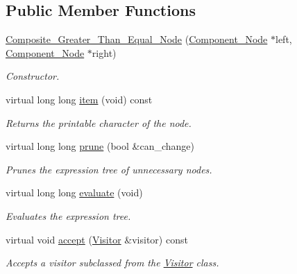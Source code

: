 \subsection*{Public Member Functions}
\begin{DoxyCompactItemize}
\item 
\hyperlink{classMadara_1_1Expression__Tree_1_1Composite__Greater__Than__Equal__Node_aae7e263fcde7a700224b11949e5772e2}{Composite\_\-Greater\_\-Than\_\-Equal\_\-Node} (\hyperlink{classMadara_1_1Expression__Tree_1_1Component__Node}{Component\_\-Node} $\ast$left, \hyperlink{classMadara_1_1Expression__Tree_1_1Component__Node}{Component\_\-Node} $\ast$right)
\begin{DoxyCompactList}\small\item\em Constructor. \item\end{DoxyCompactList}\item 
virtual long long \hyperlink{classMadara_1_1Expression__Tree_1_1Composite__Greater__Than__Equal__Node_a99f6441eda73ee71a1531f22d72f0bf8}{item} (void) const 
\begin{DoxyCompactList}\small\item\em Returns the printable character of the node. \item\end{DoxyCompactList}\item 
virtual long long \hyperlink{classMadara_1_1Expression__Tree_1_1Composite__Greater__Than__Equal__Node_a9833f0ed0c051ea406b1a67e987f2b2e}{prune} (bool \&can\_\-change)
\begin{DoxyCompactList}\small\item\em Prunes the expression tree of unnecessary nodes. \item\end{DoxyCompactList}\item 
virtual long long \hyperlink{classMadara_1_1Expression__Tree_1_1Composite__Greater__Than__Equal__Node_ab68ee252d895279d38875c66e13206dd}{evaluate} (void)
\begin{DoxyCompactList}\small\item\em Evaluates the expression tree. \item\end{DoxyCompactList}\item 
virtual void \hyperlink{classMadara_1_1Expression__Tree_1_1Composite__Greater__Than__Equal__Node_a48cbea410ff056c7fbfc714e4247ce3c}{accept} (\hyperlink{classMadara_1_1Expression__Tree_1_1Visitor}{Visitor} \&visitor) const 
\begin{DoxyCompactList}\small\item\em Accepts a visitor subclassed from the \hyperlink{classMadara_1_1Expression__Tree_1_1Visitor}{Visitor} class. \item\end{DoxyCompactList}\item 

\end{DoxyCompactItemize}
